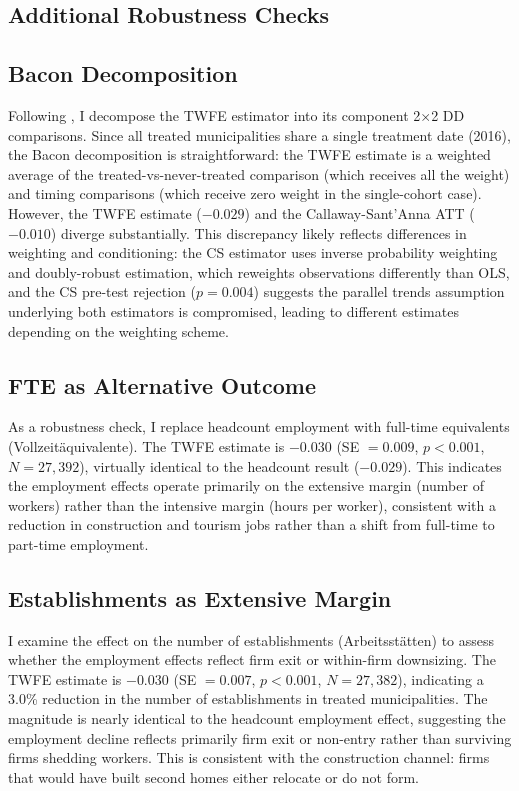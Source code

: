 \documentclass[12pt]{article}
\begin{document}
\begin{appendices}
\section{Additional Robustness Checks}\label{app:robust}

\subsection{Bacon Decomposition}

Following \citet{goodmanbacon2021}, I decompose the TWFE estimator into its component 2$\times$2 DD comparisons. Since all treated municipalities share a single treatment date (2016), the Bacon decomposition is straightforward: the TWFE estimate is a weighted average of the treated-vs-never-treated comparison (which receives all the weight) and timing comparisons (which receive zero weight in the single-cohort case). However, the TWFE estimate ($-0.029$) and the Callaway-Sant'Anna ATT ($-0.010$) diverge substantially. This discrepancy likely reflects differences in weighting and conditioning: the CS estimator uses inverse probability weighting and doubly-robust estimation, which reweights observations differently than OLS, and the CS pre-test rejection ($p = 0.004$) suggests the parallel trends assumption underlying both estimators is compromised, leading to different estimates depending on the weighting scheme.

\subsection{FTE as Alternative Outcome}

As a robustness check, I replace headcount employment with full-time equivalents (Vollzeitäquivalente). The TWFE estimate is $-0.030$ (SE $= 0.009$, $p < 0.001$, $N = 27{,}392$), virtually identical to the headcount result ($-0.029$). This indicates the employment effects operate primarily on the extensive margin (number of workers) rather than the intensive margin (hours per worker), consistent with a reduction in construction and tourism jobs rather than a shift from full-time to part-time employment.

\subsection{Establishments as Extensive Margin}

I examine the effect on the number of establishments (Arbeitsstätten) to assess whether the employment effects reflect firm exit or within-firm downsizing. The TWFE estimate is $-0.030$ (SE $= 0.007$, $p < 0.001$, $N = 27{,}382$), indicating a 3.0\% reduction in the number of establishments in treated municipalities. The magnitude is nearly identical to the headcount employment effect, suggesting the employment decline reflects primarily firm exit or non-entry rather than surviving firms shedding workers. This is consistent with the construction channel: firms that would have built second homes either relocate or do not form.


\end{appendices}
\end{document}
